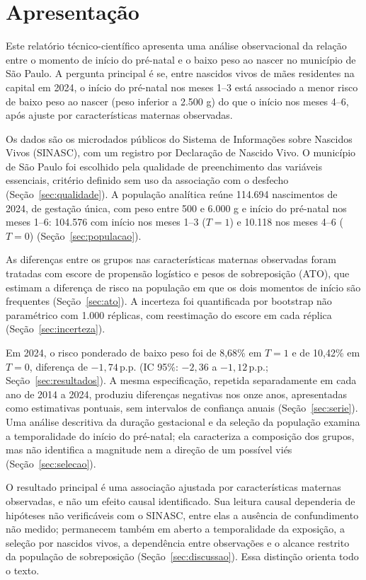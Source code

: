\documentclass[11pt,a4paper]{article}
\newcommand{\pp}{\,p.p.}
\begin{document}
\section*{Apresentação}

Este relatório técnico-científico apresenta uma análise observacional da relação entre o
momento de início do pré-natal e o baixo peso ao nascer no município de São Paulo. A
pergunta principal é se, entre nascidos vivos de mães residentes na capital em 2024, o
início do pré-natal nos meses 1--3 está associado a menor risco de baixo peso ao nascer
(peso inferior a 2.500 g) do que o início nos meses 4--6, após ajuste por características
maternas observadas.

Os dados são os microdados públicos do Sistema de Informações sobre Nascidos Vivos
(SINASC), com um registro por Declaração de Nascido Vivo. O município de São Paulo foi
escolhido pela qualidade de preenchimento das variáveis essenciais, critério definido sem
uso da associação com o desfecho (Seção~\ref{sec:qualidade}). A população analítica reúne
114.694 nascimentos de 2024, de gestação única, com peso entre 500 e 6.000 g e início do
pré-natal nos meses 1--6: 104.576 com início nos meses 1--3 ($T=1$) e 10.118 nos meses
4--6 ($T=0$) (Seção~\ref{sec:populacao}).

As diferenças entre os grupos nas características maternas observadas foram tratadas com
escore de propensão logístico e pesos de sobreposição (ATO), que estimam a diferença de
risco na população em que os dois momentos de início são frequentes
(Seção~\ref{sec:ato}). A incerteza foi quantificada por bootstrap não paramétrico com
1.000 réplicas, com reestimação do escore em cada réplica (Seção~\ref{sec:incerteza}).

Em 2024, o risco ponderado de baixo peso foi de 8,68\% em $T=1$ e de 10,42\% em $T=0$,
diferença de $-1{,}74$\pp{} (IC 95\%: $-2{,}36$ a $-1{,}12$\pp;
Seção~\ref{sec:resultados}). A mesma especificação, repetida separadamente em cada ano de
2014 a 2024, produziu diferenças negativas nos onze anos, apresentadas como estimativas
pontuais, sem intervalos de confiança anuais (Seção~\ref{sec:serie}). Uma análise
descritiva da duração gestacional e da seleção da população examina a temporalidade do
início do pré-natal; ela caracteriza a composição dos grupos, mas não identifica a
magnitude nem a direção de um possível viés (Seção~\ref{sec:selecao}).

O resultado principal é uma associação ajustada por características maternas observadas, e
não um efeito causal identificado. Sua leitura causal dependeria de hipóteses não
verificáveis com o SINASC, entre elas a ausência de confundimento não medido; permanecem
também em aberto a temporalidade da exposição, a seleção por nascidos vivos, a dependência
entre observações e o alcance restrito da população de sobreposição
(Seção~\ref{sec:discussao}). Essa distinção orienta todo o texto.
\end{document}
